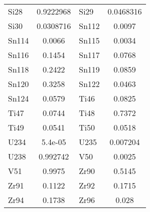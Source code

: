 \begin{longtable}{l c l c}
Si28 & 0.9222968 & Si29 & 0.0468316 \\
Si30 & 0.0308716 & Sn112 & 0.0097 \\
Sn114 & 0.0066 & Sn115 & 0.0034 \\
Sn116 & 0.1454 & Sn117 & 0.0768 \\
Sn118 & 0.2422 & Sn119 & 0.0859 \\
Sn120 & 0.3258 & Sn122 & 0.0463 \\
Sn124 & 0.0579 & Ti46 & 0.0825 \\
Ti47 & 0.0744 & Ti48 & 0.7372 \\
Ti49 & 0.0541 & Ti50 & 0.0518 \\
U234 & 5.4e-05 & U235 & 0.007204 \\
U238 & 0.992742 & V50 & 0.0025 \\
V51 & 0.9975 & Zr90 & 0.5145 \\
Zr91 & 0.1122 & Zr92 & 0.1715 \\
Zr94 & 0.1738 & Zr96 & 0.028 \\

    \bottomrule
  \end{longtable}